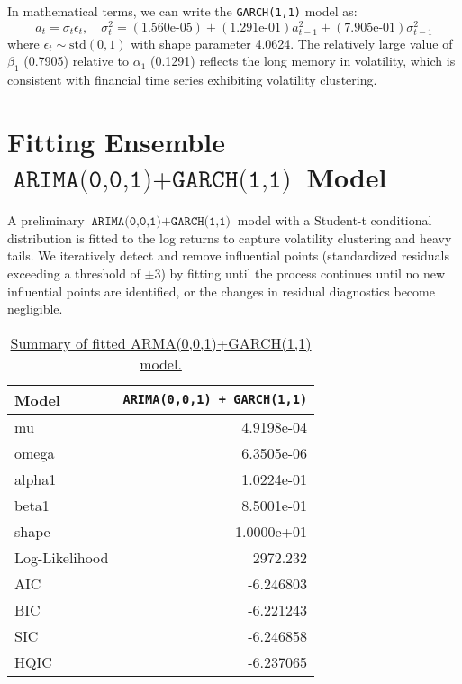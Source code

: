 \documentclass{article}
\newcommand{\1}{\mathbbm{1}}
\theoremstyle{definition}
\begin{document}
In mathematical terms, we can write the \texttt{GARCH(1,1)} model as:
$$a_t = \sigma_t \epsilon_t, \quad \sigma^2_t = (\text{1.560e-05}) + (\text{1.291e-01})a^2_{t-1} + (\text{7.905e-01})\sigma^2_{t-1}$$
where $\epsilon_t \sim \text{std}(0,1)$ with shape parameter 4.0624. The relatively large value of $\beta_1$ (0.7905) relative to $\alpha_1$ (0.1291) reflects the long memory in volatility, which is consistent with financial time series exhibiting volatility clustering.






\section{Fitting Ensemble $\texttt{ARIMA(0,0,1)}+\texttt{GARCH(1,1)}$ Model}

A preliminary $\texttt{ARIMA(0,0,1)}+\texttt{GARCH(1,1)}$ model with a Student-t conditional distribution is fitted to the log returns to capture volatility clustering and heavy tails. We iteratively detect and remove influential points (standardized residuals exceeding a threshold of $\pm 3$) by fitting until the process continues until no new influential points are identified, or the changes in residual diagnostics become negligible.

\begin{table}[H]
\centering
\begin{tabular}{l|r}
\hline
\textbf{Model}  & \texttt{ARIMA(0,0,1) + GARCH(1,1)} \\
\hline
mu & 4.9198e-04 \\
omega  & 6.3505e-06 \\
alpha1      & 1.0224e-01 \\
beta1 & 8.5001e-01\\
shape & 1.0000e+01\\
\hline
Log-Likelihood  & 2972.232\\
AIC             & -6.246803\\
BIC             & -6.221243\\
SIC             & -6.246858\\
HQIC            & -6.237065\\
\hline
\end{tabular}
\caption{\small{\href{https://github.com/Stochastic1017/Walmart-Stock-Forecasting/blob/main/R/Fit_ARMA_and_GARCH.R}{Summary of fitted ARMA(0,0,1)+GARCH(1,1) model.}}}
\label{tab:arma_garch_model_summary}
\end{table}
\end{document}
